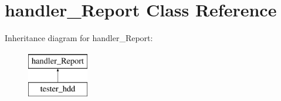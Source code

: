 \hypertarget{classhandler__Report}{
\section{handler\_\-Report Class Reference}
\label{classhandler__Report}
}
Inheritance diagram for handler\_\-Report:\begin{figure}[H]
\begin{center}
\leavevmode
\includegraphics[height=2cm]{classhandler__Report}
\end{center}
\end{figure}
